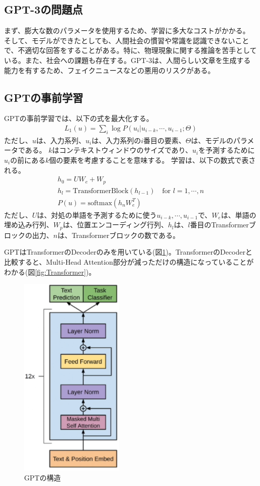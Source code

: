 \documentclass{ltjsarticle}
\begin{document}
\subsection{GPT-3の問題点}
まず、膨大な数のパラメータを使用するため、学習に多大なコストがかかる。
そして、モデルができたとしても、人間社会の慣習や常識を認識できないことで、不適切な回答をすることがある。特に、物理現象に関する推論を苦手としている。また、社会への課題も存在する。GPT-3は、人間らしい文章を生成する能力を有するため、フェイクニュースなどの悪用のリスクがある。

\subsection{GPTの事前学習}
GPTの事前学習では、以下の式を最大化する。
\begin{align}
  L_1(u) = \sum_i \log P(u_i | u_{i-k}, \cdots, u_{i-1}; \Theta)
\end{align}
ただし、$u$は、入力系列、$u_i$は、入力系列の$i$番目の要素、$\Theta$は、モデルのパラメータである。
$k$はコンテキストウィンドウのサイズであり、$u_i$を予測するために$u_i$の前にある$k$個の要素を考慮することを意味する。
学習は、以下の数式で表される。
\begin{align}
  h_0 = U W_e + W_p\\
  h_l = \text{TransformerBlock}(h_{l-1}) \quad \text{for } l = 1, \cdots, n\\
  P(u) = \text{softmax}(h_n W_e^T)
\end{align}
ただし、$U$は、対処の単語を予測するために使う$ u_{i-k}, \cdots, u_{i-1}$で、$W_e$は、単語の埋め込み行列、$W_p$は、位置エンコーディング行列、$h_l$は、$l$番目のTransformerブロックの出力、$n$は、Transformerブロックの数である。

GPTはTransformerのDecoderのみを用いている(図\ref{fig:GPT})。TransformerのDecoderと比較すると、Multi-Head Attention部分が減っただけの構造になっていることがわかる(図\ref{fig:Transformer})。
\begin{figure}[htbp]
  \centering
  \includegraphics[width=5cm]{./capture/GPT.png}
  \caption{GPTの構造}
  \label{fig:GPT}
\end{figure}
\end{document}
